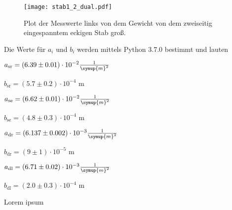 \begin{figure}
  \centering
  \texttt{[image: stab1\_2\_dual.pdf]}
  \caption{Plot der Messwerte links von dem Gewicht von dem zweiseitig eingespanntem eckigen Stab groß.}
  \label{fig:stab1_2-plot}
\end{figure}

Die Werte für $a_i$ und $b_i$ werden mittels Python 3.7.0 bestimmt und lauten

\vspace{2em}
\centerline{$a_\text{sr} = (6.39 \pm 0.01) \cdot 10^{-2} \frac{1}{\symup{m}^2}$}

\centerline{$b_\text{sr} = (5.7 \pm 0.2) \cdot 10^{-4} $ m}
\vspace{1em}
\centerline{$a_\text{se} = (6.62 \pm 0.01) \cdot 10^{-2} \frac{1}{\symup{m}^2}$}

\centerline{$b_\text{se} = (4.8 \pm 0.3) \cdot 10^{-4} $ m}
\vspace{1em}
\centerline{$a_\text{dr} = (6.137 \pm 0.002) \cdot 10^{-3} \frac{1}{\symup{m}^2} $}

\centerline{$b_\text{dr} = (9 \pm 1) \cdot 10^{-5} $ m}
\vspace{1em}
\centerline{$a_\text{dl} = (6.71 \pm 0.02) \cdot 10^{-3} \frac{1}{\symup{m}^2} $}

\centerline{$b_\text{dl} = (2.0 \pm 0.3) \cdot 10^{-4} $ m}
\vspace{1em}
Lorem ipsum